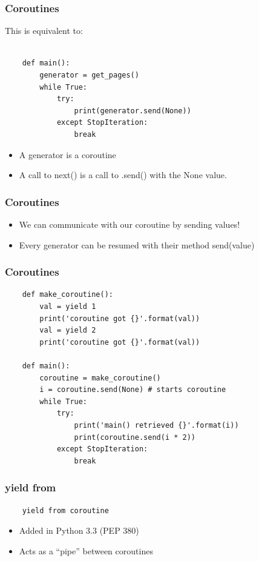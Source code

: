 \documentclass[ignorenonframetext,]{beamer}
\begin{document}
\begin{frame}[fragile]\frametitle{Coroutines}

This is equivalent to:

\begin{verbatim}

    def main():
        generator = get_pages()
        while True:
            try:
                print(generator.send(None))
            except StopIteration:
                break

\end{verbatim}

\begin{itemize}
\itemsep1pt\parskip0pt
\item
  A generator is a coroutine
\item
  A call to next() is a call to .send() with the None value.
\end{itemize}

\end{frame}

\begin{frame}[fragile]\frametitle{Coroutines}

\begin{itemize}
\itemsep1pt\parskip0pt
\item
  We can communicate with our coroutine by sending values!
\item
  Every generator can be resumed with their method send(value)
\end{itemize}

\end{frame}

\begin{frame}[fragile]\frametitle{Coroutines}

\footnotesize{
\begin{verbatim}
    def make_coroutine():
        val = yield 1
        print('coroutine got {}'.format(val))
        val = yield 2
        print('coroutine got {}'.format(val))

    def main():
        coroutine = make_coroutine()
        i = coroutine.send(None) # starts coroutine
        while True:
            try:
                print('main() retrieved {}'.format(i))
                print(coroutine.send(i * 2))
            except StopIteration:
                break
\end{verbatim}
}

\end{frame}

\begin{frame}[fragile]\frametitle{yield from}

\begin{verbatim}
    yield from coroutine
\end{verbatim}

\begin{itemize}
\itemsep1pt\parskip0pt
\item
  Added in Python 3.3 (PEP 380)
\item
  Acts as a ``pipe'' between coroutines
\end{itemize}

\end{frame}
\end{document}
